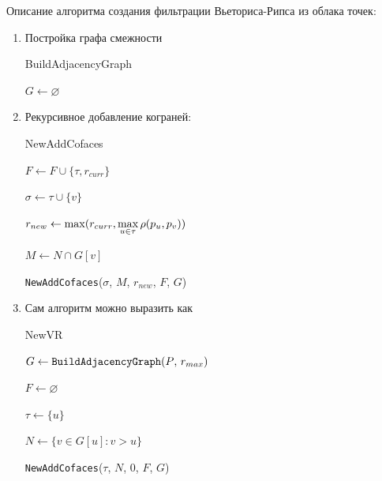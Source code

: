 \documentclass{article}
\begin{document}
Описание алгоритма создания фильтрации Вьеториса-Рипса из облака точек:
\begin{enumerate}
  \item Постройка графа смежности

    \begin{algorithm}[H]
    \caption{BuildAdjacencyGraph}
    $G \gets \varnothing$ 

    \end{algorithm}
  \item Рекурсивное добавление кограней:

    \begin{algorithm}[H]
    \caption{NewAddCofaces}
    $F \gets F \cup \{\tau, r_{curr}\}$ 

     {
      \Return
    }

     {
      $\sigma \gets \tau \cup \{v\}$

      $r_{new} \gets \max(r_{curr}, \q\max\limits_{u \in \tau} \rho(p_u, p_v))$

      $M \gets N \cap G[v]$ 

      \texttt{NewAddCofaces}($\sigma$, $M$, $r_{new}$, $F$, $G$)
    }
    \end{algorithm}

  \item Сам алгоритм можно выразить как

    \begin{algorithm}[H]
    \caption{NewVR}
    $G \gets \text{\texttt{BuildAdjacencyGraph}($P$, $r_{max}$)}$

    $F \gets \varnothing$

     {
      $\tau \gets \{u\}$

      $N \gets \{v \in G[u]\colon v > u\}$

      \texttt{NewAddCofaces}($\tau$, $N$, $0$, $F$, $G$)
    }
    \end{algorithm}
\end{enumerate}
\end{document}
